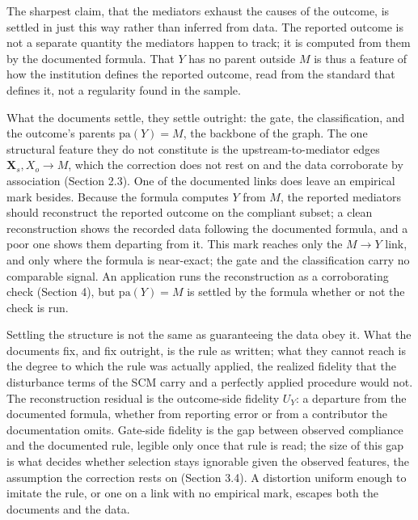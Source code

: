 The sharpest claim, that the mediators exhaust the causes of the outcome, is settled in just this way rather than inferred from data. The reported outcome is not a separate quantity the mediators happen to track; it is computed from them by the documented formula. That $Y$ has no parent outside $M$ is thus a feature of how the institution defines the reported outcome, read from the standard that defines it, not a regularity found in the sample.

What the documents settle, they settle outright: the gate, the classification, and the outcome's parents $\mathrm{pa}(Y) = M$, the backbone of the graph. The one structural feature they do not constitute is the upstream-to-mediator edges $\mathbf{X}_s, X_o \to M$, which the correction does not rest on and the data corroborate by association (Section 2.3). One of the documented links does leave an empirical mark besides. Because the formula computes $Y$ from $M$, the reported mediators should reconstruct the reported outcome on the compliant subset; a clean reconstruction shows the recorded data following the documented formula, and a poor one shows them departing from it. This mark reaches only the $M \to Y$ link, and only where the formula is near-exact; the gate and the classification carry no comparable signal. An application runs the reconstruction as a corroborating check (Section 4), but $\mathrm{pa}(Y) = M$ is settled by the formula whether or not the check is run.

Settling the structure is not the same as guaranteeing the data obey it. What the documents fix, and fix outright, is the rule as written; what they cannot reach is the degree to which the rule was actually applied, the realized fidelity that the disturbance terms of the SCM carry and a perfectly applied procedure would not. The reconstruction residual is the outcome-side fidelity $U_Y$: a departure from the documented formula, whether from reporting error or from a contributor the documentation omits. Gate-side fidelity is the gap between observed compliance and the documented rule, legible only once that rule is read; the size of this gap is what decides whether selection stays ignorable given the observed features, the assumption the correction rests on (Section 3.4). A distortion uniform enough to imitate the rule, or one on a link with no empirical mark, escapes both the documents and the data.

